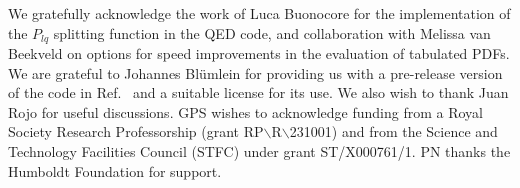\documentclass[preprint,1p,a4paper,11pt]{elsarticle}
\begin{document}
We gratefully acknowledge the work of Luca Buonocore
for the implementation of the $P_{lq}$ splitting function in the QED
code,
%
and collaboration with Melissa van Beekveld on options for speed
improvements in the evaluation of tabulated PDFs.
%
We are grateful to Johannes Bl\"umlein for providing us with a
pre-release version of the code in Ref.~\cite{BlumleinCode} and a
suitable license for its use.
%
We also wish to thank Juan Rojo for useful discussions. 
%
GPS wishes to acknowledge funding from a Royal Society Research
Professorship (grant RP$\backslash$R$\backslash$231001) and from the Science and
Technology Facilities Council (STFC) under grant ST/X000761/1.
%
PN thanks the Humboldt Foundation for support. 
%
\appendix





%
\end{document}
